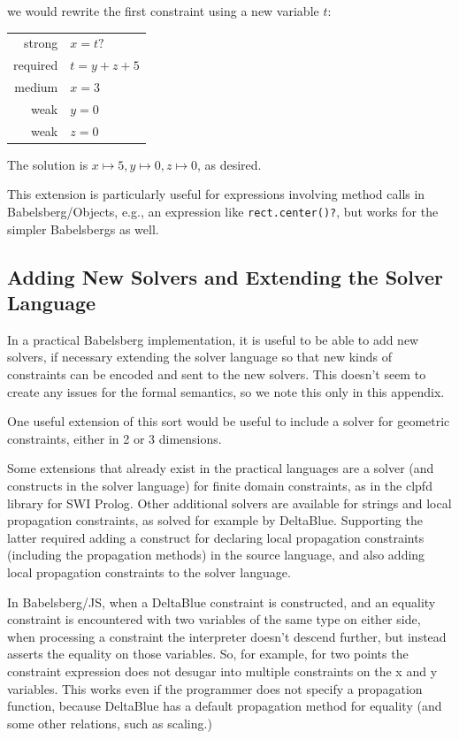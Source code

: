 \documentclass{article}
\begin{document}
we would rewrite the first constraint using a new variable $t$:

\begin{tabular}{rl}
strong   & $x=t?$ \\
required & $t=y+z+5$ \\
medium   & $x=3$ \\
weak     & $y=0$ \\
weak     & $z=0$
\end{tabular}

The solution is $x \mapsto 5, y \mapsto 0, z \mapsto 0$, as desired.

This extension is particularly useful for expressions involving method
calls in Babelsberg/Objects, e.g., an expression like
\verb|rect.center()?|, but works for the simpler Babelsbergs as well.

\subsection{Adding New Solvers and Extending the Solver Language}
\label{sec:adding-solvers}

In a practical Babelsberg implementation, it is useful to be able to
add new solvers, if necessary extending the solver language so that
new kinds of constraints can be encoded and sent to the new solvers.
This doesn't seem to create any issues for the formal semantics, so we
note this only in this appendix.

One useful extension of this sort would be useful to include a solver
for geometric constraints, either in 2 or 3 dimensions.

Some extensions that already exist in the practical languages are a
solver (and constructs in the solver language) for finite domain
constraints, as in the clpfd library for SWI Prolog.  Other additional
solvers are available for strings and local propagation constraints, as
solved for example by DeltaBlue.  Supporting the latter required adding a
construct for declaring local propagation constraints (including the
propagation methods) in the source language, and also adding local
propagation constraints to the solver language.

In Babelsberg/JS, when a DeltaBlue constraint is constructed, and an
equality constraint is encountered with two variables of the same type
on either side, when processing a constraint the interpreter doesn't
descend further, but instead asserts the equality on those
variables. So, for example, for two points the constraint expression
does not desugar into multiple constraints on the x and y
variables. This works even if the programmer does not specify a
propagation function, because DeltaBlue has a default propagation
method for equality (and some other relations, such as scaling.)
\end{document}
